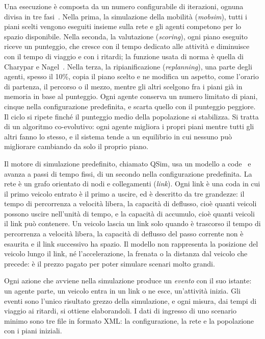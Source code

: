 Una esecuzione è composta da un numero configurabile di iterazioni, ognuna divisa in tre fasi~\cite{horni2016matsim}. Nella prima, la simulazione della mobilità (\textit{mobsim}), tutti i piani scelti vengono eseguiti insieme sulla rete e gli agenti competono per lo spazio disponibile. Nella seconda, la valutazione (\textit{scoring}), ogni piano eseguito riceve un punteggio, che cresce con il tempo dedicato alle attività e diminuisce con il tempo di viaggio e con i ritardi; la funzione usata di norma è quella di Charypar e Nagel~\cite{charypar2005generating}. Nella terza, la ripianificazione (\textit{replanning}), una parte degli agenti, spesso il 10\%, copia il piano scelto e ne modifica un aspetto, come l'orario di partenza, il percorso o il mezzo, mentre gli altri scelgono fra i piani già in memoria in base al punteggio. Ogni agente conserva un numero limitato di piani, cinque nella configurazione predefinita, e scarta quello con il punteggio peggiore. Il ciclo si ripete finché il punteggio medio della popolazione si stabilizza. Si tratta di un algoritmo co-evolutivo: ogni agente migliora i propri piani mentre tutti gli altri fanno lo stesso, e il sistema tende a un equilibrio in cui nessuno può migliorare cambiando da solo il proprio piano.

Il motore di simulazione predefinito, chiamato QSim, usa un modello a code~\cite{gawron1998iterative} e avanza a passi di tempo fissi, di un secondo nella configurazione predefinita. La rete è un grafo orientato di nodi e collegamenti (\textit{link}). Ogni link è una coda in cui il primo veicolo entrato è il primo a uscire, ed è descritto da tre grandezze: il tempo di percorrenza a velocità libera, la capacità di deflusso, cioè quanti veicoli possono uscire nell'unità di tempo, e la capacità di accumulo, cioè quanti veicoli il link può contenere. Un veicolo lascia un link solo quando è trascorso il tempo di percorrenza a velocità libera, la capacità di deflusso del passo corrente non è esaurita e il link successivo ha spazio. Il modello non rappresenta la posizione del veicolo lungo il link, né l'accelerazione, la frenata o la distanza dal veicolo che precede: è il prezzo pagato per poter simulare scenari molto grandi.

Ogni azione che avviene nella simulazione produce un \textit{evento} con il suo istante: un agente parte, un veicolo entra in un link o ne esce, un'attività inizia. Gli eventi sono l'unico risultato grezzo della simulazione, e ogni misura, dai tempi di viaggio ai ritardi, si ottiene elaborandoli. I dati di ingresso di uno scenario minimo sono tre file in formato XML: la configurazione, la rete e la popolazione con i piani iniziali.

